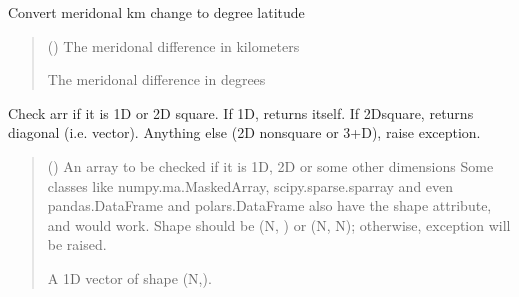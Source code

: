 \documentclass[letterpaper,10pt,english]{sphinxmanual}
\begin{document}
\begin{fulllineitems}
\label{\detokenize{misc:glomar_gridding.utils.km_to_deg}}
\pysigstartsignatures
\pysiglinewithargsret
{}
{}
{}
\pysigstopsignatures
\sphinxAtStartPar
Convert meridonal km change to degree latitude
\begin{quote}\begin{description}
\sphinxAtStartPar
{} () \textendash{} The meridonal difference in kilometers

\sphinxAtStartPar
The meridonal difference in degrees

\sphinxAtStartPar
{}

\end{description}\end{quote}

\end{fulllineitems}


\begin{fulllineitems}
\label{\detokenize{misc:glomar_gridding.utils.make_diag}}
\pysigstartsignatures
\pysiglinewithargsret
{}
{}
{}
\pysigstopsignatures
\sphinxAtStartPar
Check arr if it is 1D or 2D square.
If 1D, returns itself.
If 2D\sphinxhyphen{}square, returns diagonal (i.e. vector).
Anything else (2D non\sphinxhyphen{}square or 3+D), raise exception.
\begin{quote}\begin{description}
\sphinxAtStartPar
{} () \textendash{} An array to be checked if it is 1D, 2D or some other dimensions
Some classes like numpy.ma.MaskedArray, scipy.sparse.sparray and even
pandas.DataFrame and polars.DataFrame also have the shape attribute,
and would work. Shape should be (N, ) or (N, N); otherwise, exception
will be raised.

\sphinxAtStartPar
A 1D vector of shape (N,).

\sphinxAtStartPar
{}

\end{description}\end{quote}

\end{fulllineitems}
\end{document}
